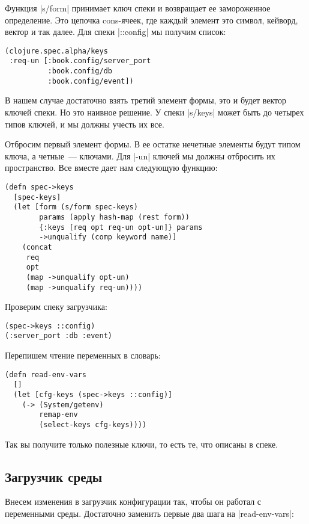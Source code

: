 Функция \spverb|s/form| принимает ключ спеки и возвращает ее замороженное
определение. Это цепочка cons-ячеек, где каждый элемент это символ, кейворд,
вектор и так далее. Для спеки \spverb|::config| мы получим список:

\begin{verbatim}
(clojure.spec.alpha/keys
 :req-un [:book.config/server_port
          :book.config/db
          :book.config/event])
\end{verbatim}

В нашем случае достаточно взять третий элемент формы, это и будет вектор ключей
спеки. Но это наивное решение. У спеки \spverb|s/keys| может быть до четырех типов
ключей, и мы должны учесть их все.

Отбросим первый элемент формы. В ее остатке нечетные элементы будут типом ключа,
а четные~--- ключами. Для \spverb|-un| ключей мы должны отбросить их пространство. Все
вместе дает нам следующую функцию:

\begin{verbatim}
(defn spec->keys
  [spec-keys]
  (let [form (s/form spec-keys)
        params (apply hash-map (rest form))
        {:keys [req opt req-un opt-un]} params
        ->unqualify (comp keyword name)]
    (concat
     req
     opt
     (map ->unqualify opt-un)
     (map ->unqualify req-un))))
\end{verbatim}

Проверим спеку загрузчика:

\begin{verbatim}
(spec->keys ::config)
(:server_port :db :event)
\end{verbatim}

Перепишем чтение переменных в словарь:

\begin{verbatim}
(defn read-env-vars
  []
  (let [cfg-keys (spec->keys ::config)]
    (-> (System/getenv)
        remap-env
        (select-keys cfg-keys))))
\end{verbatim}

Так вы получите только полезные ключи, то есть те, что описаны в спеке.

\subsection{Загрузчик среды}

Внесем изменения в загрузчик конфигурации так, чтобы он работал с переменными
среды. Достаточно заменить первые два шага на \spverb|read-env-vars|:

